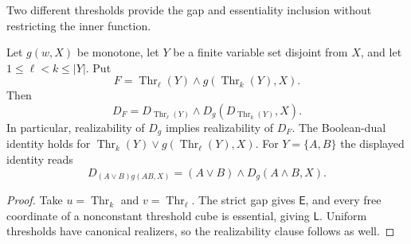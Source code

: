 Two different thresholds provide the gap and essentiality inclusion
without restricting the inner function.

\begin{corollary}
\label{core:prop:essential-threshold-band}
Let $g(w,X)$ be monotone, let $Y$ be a finite variable set disjoint from
$X$, and let $1\leq\ell<k\leq|Y|$. Put
\[
 F=\operatorname{Thr}_{\ell}(Y)\wedge
       g(\operatorname{Thr}_k(Y),X).
\]
Then
\[
 D_F=D_{\operatorname{Thr}_{\ell}(Y)}\wedge
       D_g(D_{\operatorname{Thr}_k(Y)},X).
\]
In particular, realizability of $D_g$ implies realizability of $D_F$.
The Boolean-dual identity holds for
$\operatorname{Thr}_k(Y)\vee g(\operatorname{Thr}_{\ell}(Y),X)$.
For $Y=\{A,B\}$ the displayed identity reads
\[
 D_{(A\vee B)g(AB,X)}=(A\vee B)\wedge D_g(A\wedge B,X).
\]
\end{corollary}
\begin{proof}
Take $u=\operatorname{Thr}_k$ and $v=\operatorname{Thr}_{\ell}$.
The strict gap gives $\mathsf E$, and every free coordinate of a
nonconstant threshold cube is essential, giving $\mathsf L$.
Uniform thresholds have canonical realizers, so the realizability
clause follows as well.
\end{proof}
